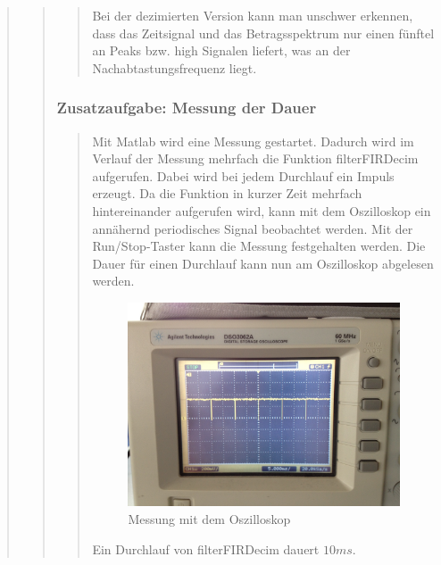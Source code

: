 \begin{quote}
\begin{quote}
\begin{quote}
        	Bei der dezimierten Version kann man unschwer erkennen, dass das
        	Zeitsignal und das Betragsspektrum nur einen fünftel an Peaks bzw. high
        	Signalen liefert, was an der Nachabtastungsfrequenz liegt.
        	
        \end{quote}
        
        
        \subsubsection{Zusatzaufgabe: Messung der Dauer}
		\begin{quote}
			Mit Matlab wird eine Messung gestartet. Dadurch wird im Verlauf der Messung mehrfach die 
            Funktion filterFIRDecim aufgerufen. Dabei wird bei jedem Durchlauf
            ein Impuls erzeugt. Da die Funktion in kurzer Zeit mehrfach hintereinander aufgerufen wird, 
            kann mit dem Oszilloskop ein annähernd periodisches Signal
            beobachtet werden. Mit der Run/Stop-Taster kann die Messung festgehalten werden. 
            Die Dauer für einen Durchlauf kann nun am Oszilloskop abgelesen
            werden.\\
        
            \begin{figure}[H]
            \centering
                \includegraphics[scale=0.2, trim = 0cm 0cm 0cm 0cm, clip]{./Bilder/Foto.jpg}
                    \caption{Messung mit dem Oszilloskop}
            \end{figure}
        
            Ein Durchlauf von filterFIRDecim dauert $10ms$.
            
		\end{quote} %
        
    \end{quote}  %
\end{quote} %

